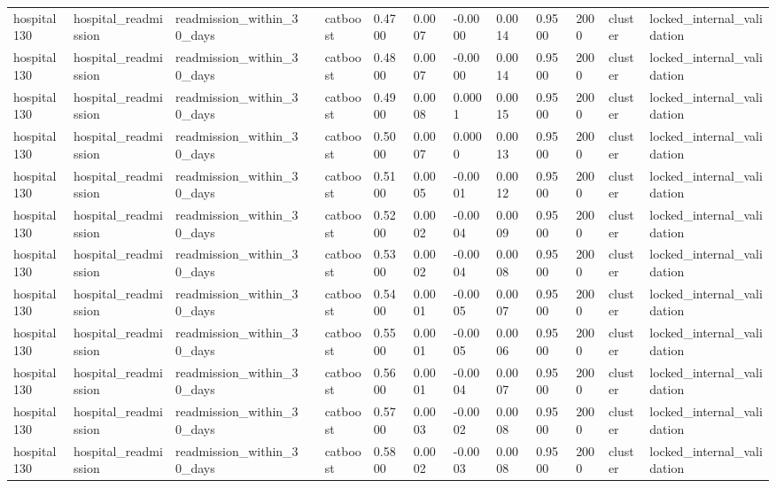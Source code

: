 \begin{tabular}{lllllllllllll}
hospital130 & hospital\_readmission & readmission\_within\_30\_days &  & catboost & 0.4700 & 0.0007 & -0.0000 & 0.0014 & 0.9500 & 2000 & cluster & locked\_internal\_validation \\
hospital130 & hospital\_readmission & readmission\_within\_30\_days &  & catboost & 0.4800 & 0.0007 & -0.0000 & 0.0014 & 0.9500 & 2000 & cluster & locked\_internal\_validation \\
hospital130 & hospital\_readmission & readmission\_within\_30\_days &  & catboost & 0.4900 & 0.0008 & 0.0001 & 0.0015 & 0.9500 & 2000 & cluster & locked\_internal\_validation \\
hospital130 & hospital\_readmission & readmission\_within\_30\_days &  & catboost & 0.5000 & 0.0007 & 0.0000 & 0.0013 & 0.9500 & 2000 & cluster & locked\_internal\_validation \\
hospital130 & hospital\_readmission & readmission\_within\_30\_days &  & catboost & 0.5100 & 0.0005 & -0.0001 & 0.0012 & 0.9500 & 2000 & cluster & locked\_internal\_validation \\
hospital130 & hospital\_readmission & readmission\_within\_30\_days &  & catboost & 0.5200 & 0.0002 & -0.0004 & 0.0009 & 0.9500 & 2000 & cluster & locked\_internal\_validation \\
hospital130 & hospital\_readmission & readmission\_within\_30\_days &  & catboost & 0.5300 & 0.0002 & -0.0004 & 0.0008 & 0.9500 & 2000 & cluster & locked\_internal\_validation \\
hospital130 & hospital\_readmission & readmission\_within\_30\_days &  & catboost & 0.5400 & 0.0001 & -0.0005 & 0.0007 & 0.9500 & 2000 & cluster & locked\_internal\_validation \\
hospital130 & hospital\_readmission & readmission\_within\_30\_days &  & catboost & 0.5500 & 0.0001 & -0.0005 & 0.0006 & 0.9500 & 2000 & cluster & locked\_internal\_validation \\
hospital130 & hospital\_readmission & readmission\_within\_30\_days &  & catboost & 0.5600 & 0.0001 & -0.0004 & 0.0007 & 0.9500 & 2000 & cluster & locked\_internal\_validation \\
hospital130 & hospital\_readmission & readmission\_within\_30\_days &  & catboost & 0.5700 & 0.0003 & -0.0002 & 0.0008 & 0.9500 & 2000 & cluster & locked\_internal\_validation \\
hospital130 & hospital\_readmission & readmission\_within\_30\_days &  & catboost & 0.5800 & 0.0002 & -0.0003 & 0.0008 & 0.9500 & 2000 & cluster & locked\_internal\_validation \\

\end{tabular}
